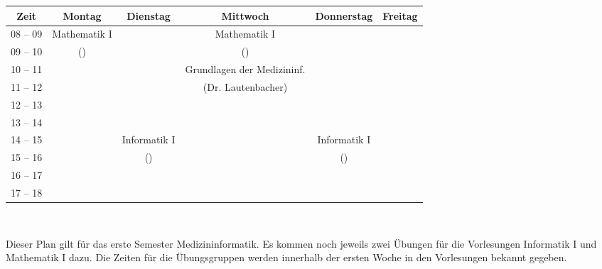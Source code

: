 \begin{minipage}{\textwidth}
    \footnotesize
\begin{center}
\begin{tabular}{|c|c|c|c|c|c|}
	\hline
	Zeit    & Montag       	& Dienstag    	& Mittwoch                  	& Donnerstag	& Freitag   \\\hline\hline
	08 – 09 & Mathematik I 	&             	& Mathematik I              	&				&			\\\cline{1-1}\cline{3-3}\cline{5-6}
	09 – 10 & (\Matheprof) 	&             	& (\Matheprof)              	&   			&			\\\hline
	10 – 11 &              	&             	& Grundlagen der Medizininf.	&				&			\\\cline{1-3}\cline{5-6}
	11 – 12 &              	&             	& (Dr. Lautenbacher)        	&				&			\\\hline
	12 – 13 &              	&             	&                           	&				&			\\\hline
	13 – 14 &              	&             	&                           	&				&			\\\hline
	14 – 15 &              	& Informatik I	&                           	& Informatik I	&			\\\cline{1-2}\cline{4-4}\cline{6-6}
	15 – 16 &              	& (\Infoprof) 	&                           	& (\Infoprof)	&			\\\hline
	16 – 17 &              	&             	&                           	&				&			\\\hline
	17 – 18 &              	&             	&                           	&				&			\\\hline
\end{tabular}
    ~\\
\end{center}
\end{minipage}
Dieser Plan gilt für das erste Semester Medizininformatik. Es kommen noch jeweils zwei Übungen für die Vorlesungen
Informatik I und Mathematik I dazu. Die Zeiten für die Übungsgruppen werden innerhalb der ersten Woche in den Vorlesungen bekannt gegeben. \\ \\
